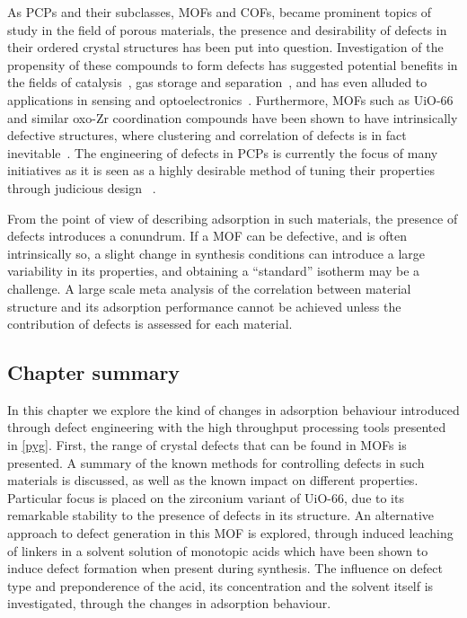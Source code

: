 As \glspl{PCP} and their subclasses, \glspl{MOF} and  \glspl{COF},
became prominent topics of study in the field of porous materials,
the presence and desirability of defects in their ordered crystal
structures has been put into question. Investigation of the 
propensity of these compounds to form defects has suggested 
potential benefits in the fields of 
catalysis~\cite{shollDefectsMetalOrganic2015}, gas storage
and separation~\cite{%
    choiRoleStructuralDefects2018,%
    ghoshWaterAdsorptionUiO662014,%
    liSelectiveGasAdsorption2009%
}, and has even alluded to applications in
sensing and optoelectronics~\cite{cliffeMetalOrganicNanosheets2017}.
Furthermore, \glspl{MOF}
such as UiO-66 and similar oxo-Zr coordination compounds have been 
shown to have intrinsically defective structures, where clustering 
and correlation of defects is in fact 
inevitable~\cite{cliffeCorrelatedDefectNanoregions2014}.
The engineering of defects in \glspl{PCP} is currently the focus of many
initiatives as it is seen as a highly desirable method of tuning 
their properties through judicious design
~\cite{
    shollDefectsMetalOrganic2015,%
    bennettInterplayDefectsDisorder2016,%
    liangLinkingDefectsHierarchical2018%
}.

From the point of view of describing adsorption in 
such materials, the presence of defects introduces a conundrum.
If a \gls{MOF} can be defective, and is often intrinsically so,
a slight change in synthesis conditions can introduce a 
large variability in its properties, and obtaining a 
``standard'' isotherm may be a challenge. A large scale
meta analysis of the correlation between material structure
and its adsorption performance cannot be achieved unless
the contribution of defects is assessed for each material.

\subsection*{Chapter summary}

In this chapter we explore the kind of changes in 
adsorption behaviour introduced through defect engineering with 
the high throughput processing tools presented in \autoref{pyg}.
First, the range of crystal defects that can be found in \glspl{MOF} 
is presented. A summary of the known methods for controlling defects in
such materials is discussed, as well as the known impact on 
different properties.
Particular focus is placed on the zirconium variant of UiO-66,
due to its remarkable stability to the presence of defects in its
structure.
An alternative approach to defect generation in this \gls{MOF} is explored,
through induced leaching of linkers in a solvent solution of monotopic
acids which have been shown to induce defect formation when present
during synthesis. The influence on defect type and preponderence 
of the acid, its concentration and 
the solvent itself is investigated, through the changes in 
adsorption behaviour.

